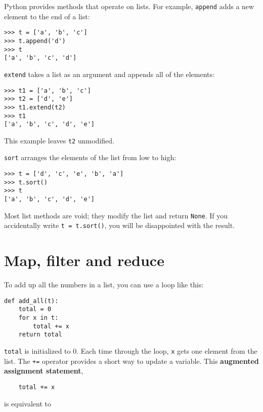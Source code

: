 \documentclass[10pt]{book}
\begin{document}
Python provides methods that operate on lists.  For example,
{\tt append} adds a new element to the end of a list:

\begin{verbatim}
>>> t = ['a', 'b', 'c']
>>> t.append('d')
>>> t
['a', 'b', 'c', 'd']
\end{verbatim}
%
{\tt extend} takes a list as an argument and appends all of
the elements:

\begin{verbatim}
>>> t1 = ['a', 'b', 'c']
>>> t2 = ['d', 'e']
>>> t1.extend(t2)
>>> t1
['a', 'b', 'c', 'd', 'e']
\end{verbatim}
%
This example leaves {\tt t2} unmodified.

{\tt sort} arranges the elements of the list from low to high:

\begin{verbatim}
>>> t = ['d', 'c', 'e', 'b', 'a']
>>> t.sort()
>>> t
['a', 'b', 'c', 'd', 'e']
\end{verbatim}
%
Most list methods are void; they modify the list and return {\tt None}.
If you accidentally write {\tt t = t.sort()}, you will be disappointed
with the result.


\section{Map, filter and reduce}
\label{filter}

To add up all the numbers in a list, you can use a loop like this:


\begin{verbatim}
def add_all(t):
    total = 0
    for x in t:
        total += x
    return total
\end{verbatim}
%
{\tt total} is initialized to 0.  Each time through the loop,
{\tt x} gets one element from the list.  The {\tt +=} operator
provides a short way to update a variable.  This 
{\bf augmented assignment statement},

\begin{verbatim}
    total += x
\end{verbatim}
%
is equivalent to
\end{document}
